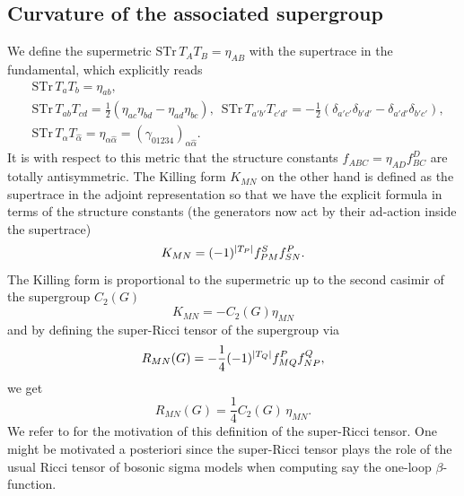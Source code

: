 \documentclass[12pt]{article}
\def\be{\begin{equation}}
\def\ee{\end{equation}}
\numberwithin{equation}{section}
\newcommand{\h}[1]{\hat{#1}}
\begin{document}
\subsection{Curvature of the associated supergroup}
\label{curvSec}
We define the supermetric $\text{STr} \,T_A T_B = \eta_{AB}$ with the supertrace in the fundamental, which explicitly reads
\be
\begin{aligned}
	&\text{STr} \,T_a T_b = \eta_{ab}, \\
	&\text{STr} \,T_{ab} T_{cd} = \frac{1}{2}(\eta_{ac} \eta_{bd} - \eta_{ad} \eta_{bc}), \,\,\, \text{STr} \,T_{a'b'} T_{c'd'} = -\frac{1}{2}(\delta_{a'c'} \delta_{b'd'} - \delta_{a'd'} \delta_{b'c'}), \\
	&\text{STr} \,T_\alpha T_{\h{\alpha}} = \eta_{\alpha \h{\alpha}} = (\gamma_{01234})_{\alpha \h{\alpha}}.
\end{aligned}
\ee
It is with respect to this metric that the structure constants $f_{ABC} = \eta_{AD} f^D_{BC}$ are totally antisymmetric. The Killing form $K_{MN}$ on the other hand is defined as the supertrace in the adjoint representation so that we have the explicit formula in terms of the structure constants (the generators now act by their ad-action inside the supertrace)
\be
K_{MN} = (-1)^{\abs{T_P}} f^S_{PM} f^P_{SN}.
\ee
The Killing form is proportional to the supermetric up to the second casimir of the supergroup $C_2(G)$
\be
K_{MN} = -C_2(G) \eta_{MN}
\ee
and by defining the super-Ricci tensor of the supergroup via
\be
R_{MN}(G) = -\frac{1}{4} (-1)^{\abs{T_Q}} f^P_{MQ} f^Q_{NP},
\ee
we get
\be
R_{MN}(G) = \frac{1}{4} C_2(G) \,\eta_{MN}.
\ee
We refer to \cite{Berkovits:1999zq} for the motivation of this definition of the super-Ricci tensor. One might be motivated a posteriori since the super-Ricci tensor plays the role of the usual Ricci tensor of bosonic sigma models when computing say the one-loop $\beta$-function.
\end{document}
